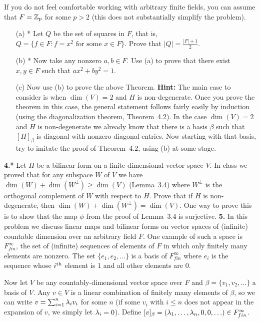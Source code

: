 \documentclass[12pt]{amsart}
\begin{document}
\sk If you do not feel comfortable working with arbitrary finite fields, you can assume that $F={\mathbb Z}_p$ for some $p>2$ (this does not substantially simplify the problem).
 
\begin{itemize}
\item[(a)]* Let $Q$ be the set of squares in $F$, that is, $Q=\{f\in F: f=x^2\mbox{ for some }x\in F\}$. Prove that $|Q|=\frac{|F|+1}{2}$.
\item[(b)]* Now take any nonzero $a,b\in F$. Use (a) to prove that there exist $x,y\in F$ such that $ax^2+by^2=1$.
\item[(c)] Now use (b) to prove the above Theorem. {\bf Hint:} The main case to consider is when $\dim(V)=2$ and $H$ is non-degenerate. Once you prove the theorem in this case, the general statement follows fairly easily by induction (using the diagonalization theorem, Theorem~4.2). In the case
$\dim(V)=2$ and $H$ is non-degenerate we already know that there is a basis $\beta$ such that $[H]_{\beta}$ is diagonal with nonzero diagonal entries.
Now starting with that basis, try to imitate the proof of Theorem~4.2, using (b) at some stage.
\end{itemize}

\skv
{\bf 4.}* Let $H$ be a bilinear form on a finite-dimensional vector space $V$. In class we proved that for any subspace $W$ of $V$
we have $\dim(W)+\dim(W^{\perp})\geq \dim(V)$ (Lemma~3.4) where $W^{\perp}$ is the orthogonal complement of $W$ with respect to $H$. Prove that if $H$ is non-degenerate, then $\dim(W)+\dim(W^{\perp})= \dim(V)$. One way to prove this is to show that the map $\phi$ from the proof of Lemma~3.4 is surjective.
\skv
{\bf 5.} In this problem we discuss linear maps and bilinear forms on vector spaces of (infinite) countable dimension over an arbitrary field $F$. One example of such a space is $F^{\infty}_{fin}$, the set of (infinite) sequences of elements of $F$ in which only finitely many elements are nonzero. The set $\{e_1,e_2,\ldots\}$ is a basis of $F^{\infty}_{fin}$ where $e_i$ is the sequence whose $i^{\rm th}$ element is $1$ and all other elements are $0$.

\sk Now let $V$ be any countably-dimensional vector space over $F$ and $\beta=\{v_1,v_2,\ldots \}$ a basis of $V$. Any $v\in V$ is a linear combination of finitely many elements of $\beta$, so we can write $v=\sum_{i=1}^n {\lambda}_i v_i$ for some $n$ (if some $v_i$ with $i\leq n$ does not appear in the expansion of $v$, we simply let ${\lambda}_i=0$). Define $[v]_{\beta}=({\lambda}_1,\ldots,{\lambda}_n,0,0,\ldots)\in F^{\infty}_{fin}$.
\end{document}
